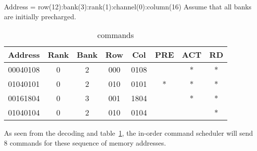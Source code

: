 \documentclass[a4paper, 11pt]{exam}
\begin{document}
\begin{enumerate}
\hspace{20pt} Address = row(12):bank(3):rank(1):channel(0):column(16)\newline
\hspace{20pt} Assume that all banks are initially precharged.

\begin{table}[hbt]
\begin{center}
\caption{commands}
\label{cmds}
\begin{tabular}{|c|c|c|c|c|c|c|c|}
 \hline
 \textbf{Address} & \textbf{Rank} & \textbf{Bank} & \textbf{Row} & \textbf{Col} & \textbf{PRE} & \textbf{ACT} & \textbf{RD}\\
 \hline
 00040108  & 0 & 2 & 000 & 0108 & & * & *\\
 \hline
 01040101  & 0 & 2 & 010 & 0101 & * & * & *\\
 \hline
 00161804  & 0 & 3 & 001 & 1804 & & * & *\\
 \hline
 01040104  & 0 & 2 & 010 & 0104 & & & *\\
 \hline
 \end{tabular}
 \end{center}
\end{table}

As seen from the decoding and table~\ref{cmds}, the in-order command scheduler will send 8 commands for these sequence of memory addresses.

\end{enumerate}
\end{document}

